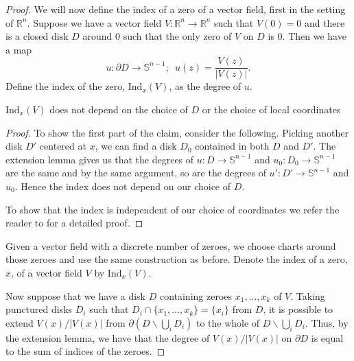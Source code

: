 \documentclass[12pt,a4paper]{article}
\begin{document}
\begin{proof}
%
%
We will now define the index of a zero of a vector field, first in the setting of $\mathbb{R}^n$. Suppose we have a vector field $V:\mathbb{R}^n\to\mathbb{R}^n$ such that $V(0)=0$ and there is a closed disk $D$ around 0 such that the only zero of $V$ on $D$ is 0. Then we have a map \[u:\partial D\to\mathbb{S}^{n-1};\,\,\, u(z)=\frac{V(z)}{|V(z)|}.\] Define the index of the zero, $\mathrm{Ind}_x(V)$, as the degree of $u$.

\begin{proposition}
$\mathrm{Ind}_x(V)$ does not depend on the choice of $D$ or the choice of local coordinates
\end{proposition}
\begin{proof}
To show the first part of the claim, consider the following. Picking another disk $D'$ centered at $x$, we can find a disk $D_0$ contained in both $D$ and $D'$. The extension lemma gives us that the degrees of $u:D\to\mathbb{S}^{n-1}$ and $u_0:D_0\to\mathbb{S}^{n-1}$ are the same and by the same argument, so are the degrees of $u':D'\to\mathbb{S}^{n-1}$ and $u_0$. Hence the index does not depend on our choice of $D$.

To show that the index is independent of our choice of coordinates we refer the reader to \cite{BurnsGidea} for a detailed proof.

\end{proof}

Given a vector field with a discrete number of zeroes, we choose charts around those zeroes and use the same construction as before. Denote the index of a zero, $x$, of a vector field $V$ by $\mathrm{Ind}_x(V)$.

Now suppose that we have a disk $D$ containing zeroes $x_1,\ldots,x_k$ of $V$. Taking punctured disks $D_i$ such that $D_i\cap\{x_1,\ldots,x_k\}=\{x_i\}$ from $D$, it is possible to extend $V(x)/|V(x)|$ from $\partial(D\backslash\bigcup_iD_i)$ to the whole of $D\backslash\bigcup_iD_i$. Thus, by the extension lemma, we have that the degree of $V(x)/|V(x)|$ on $\partial D$ is equal to the sum of indices of the zeroes.


\end{proof}
\end{document}
